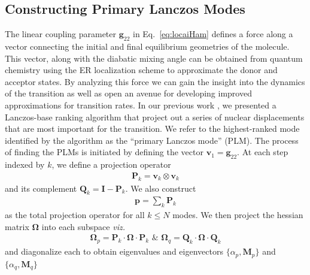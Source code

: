 





\subsection{Constructing Primary Lanczos Modes}
The linear coupling parameter $ {\mathbf g}_{22}$ in Eq.~\ref{eq:locaiHam} defines
a force
along a vector connecting
the initial and final equilibrium geometries of the molecule.
This vector, along with the diabatic mixing angle can be obtained from quantum chemistry
using the ER localization
scheme to approximate the donor and acceptor states.
By analyzing this force we can gain the insight into the dynamics of the transition as well as
open an avenue for developing improved approximations for transition rates.
In our previous work \cite{yang2014intramolecular},  we presented a Lanczos-base ranking algorithm that project
out a series of nuclear displacements that are most important for
the transition.   We refer to the highest-ranked mode identified by the algorithm
as the ``primary Lanczos mode'' (PLM).
The process of finding the PLMs is initiated by defining the vector ${\mathbf v}_{1} = {\mathbf g}_{22}$.
At each step indexed by $k$,  we define a projection operator
\begin{eqnarray}
{\mathbf P}_{k} = {\mathbf v}_{k}\otimes  {\mathbf v}_{k}
\end{eqnarray}
and its complement ${\mathbf Q}_{k} = {\mathbf I}  - {\mathbf P}_{k}$.
We also construct
\begin{eqnarray}
\mathbf p = \sum_{k} \mathbf P_{k}
\end{eqnarray}
as  the total projection operator for all ${k} \le N$ modes.
We then project the hessian matrix $\mathbf\Omega$ into each subspace {\em viz.}
\begin{eqnarray}
\mathbf\Omega_{p} = \mathbf P_{k}\cdot \mathbf\Omega \cdot \mathbf P_{k} \,\, \& \,\, \mathbf\Omega_{q} = \mathbf Q_{k}\cdot \mathbf\Omega \cdot  \mathbf Q_{k}
\end{eqnarray}
and diagonalize each to obtain eigenvalues and eigenvectors $\{\alpha_{p}, {\mathbf M}_{p}\}$ and $\{\alpha_{q}, {\mathbf M}_{q}\}$
